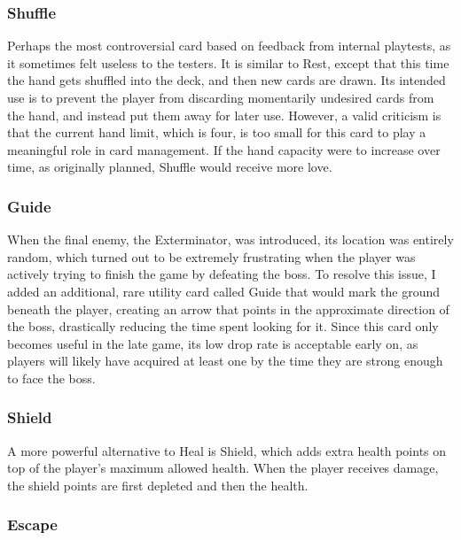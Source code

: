 \subsubsection{Shuffle}

Perhaps the most controversial card based on feedback from internal playtests, as it sometimes felt useless to the testers. It is similar to Rest, except that this time the hand gets shuffled into the deck, and then new cards are drawn. Its intended use is to prevent the player from discarding momentarily undesired cards from the hand, and instead put them away for later use. However, a valid criticism is that the current hand limit, which is four, is too small for this card to play a meaningful role in card management. If the hand capacity were to increase over time, as originally planned, Shuffle would receive more love.



\subsubsection{Guide}

When the final enemy, the Exterminator, was introduced, its location was entirely random, which turned out to be extremely frustrating when the player was actively trying to finish the game by defeating the boss. To resolve this issue, I added an additional, rare utility card called Guide that would mark the ground beneath the player, creating an arrow that points in the approximate direction of the boss, drastically reducing the time spent looking for it. Since this card only becomes useful in the late game, its low drop rate is acceptable early on, as players will likely have acquired at least one by the time they are strong enough to face the boss.



\subsubsection{Shield}

A more powerful alternative to Heal is Shield, which adds extra health points on top of the player's maximum allowed health. When the player receives damage, the shield points are first depleted and then the health.




\subsubsection{Escape}

